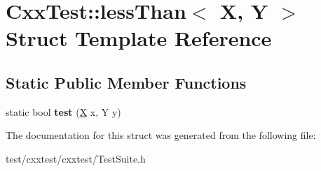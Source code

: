 \hypertarget{structCxxTest_1_1lessThan}{\section{Cxx\-Test\-:\-:less\-Than$<$ X, Y $>$ Struct Template Reference}
\label{structCxxTest_1_1lessThan}
}
\subsection*{Static Public Member Functions}
\begin{DoxyCompactItemize}
\item 
\hypertarget{structCxxTest_1_1lessThan_a5a5c536586b55d624ef662ffc9873af8}{static bool {\bfseries test} (\hyperlink{classX}{X} x, Y y)}\label{structCxxTest_1_1lessThan_a5a5c536586b55d624ef662ffc9873af8}

\end{DoxyCompactItemize}


The documentation for this struct was generated from the following file\-:\begin{DoxyCompactItemize}
\item 
test/cxxtest/cxxtest/Test\-Suite.\-h\end{DoxyCompactItemize}
